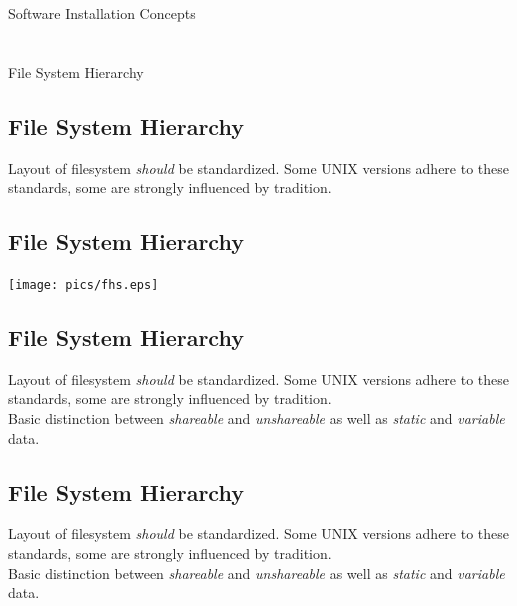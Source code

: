 \documentclass[xga]{xdvislides}
\begin{document}
\newpage
\vspace*{\fill}
\begin{center}
	\Hugesize
		Software Installation Concepts \\ [1em]
	\hspace*{5mm}
	\blueline\\
	\hspace*{5mm}\\
		File System Hierarchy
\end{center}
\vspace*{\fill}

\subsection{File System Hierarchy}
Layout of filesystem {\em should} be standardized.  Some UNIX versions adhere
to these standards, some are strongly influenced by tradition.

\subsection{File System Hierarchy}
\vspace*{\fill}
\begin{center}
	\texttt{[image: pics/fhs.eps]}
\end{center}
\vspace*{\fill}

\subsection{File System Hierarchy}
Layout of filesystem {\em should} be standardized.  Some UNIX versions adhere
to these standards, some are strongly influenced by tradition.
\\

Basic distinction between {\em shareable} and {\em unshareable} as well
as {\em static} and {\em variable} data.

\subsection{File System Hierarchy}
Layout of filesystem {\em should} be standardized.  Some UNIX versions adhere
to these standards, some are strongly influenced by tradition.
\\

Basic distinction between {\em shareable} and {\em unshareable} as well
as {\em static} and {\em variable} data.
\\
\end{document}
